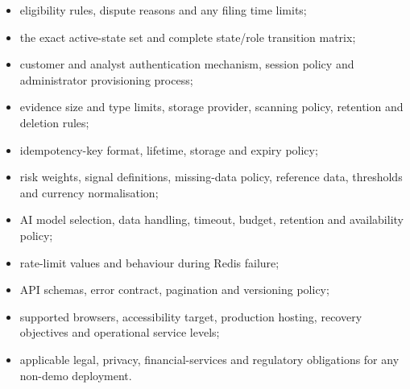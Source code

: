\documentclass[11pt,a4paper]{article}
\begin{document}
\begin{itemize}
    \item eligibility rules, dispute reasons and any filing time limits;
    \item the exact active-state set and complete state/role transition
    matrix;
    \item customer and analyst authentication mechanism, session policy
    and administrator provisioning process;
    \item evidence size and type limits, storage provider, scanning
    policy, retention and deletion rules;
    \item idempotency-key format, lifetime, storage and expiry policy;
    \item risk weights, signal definitions, missing-data policy,
    reference data, thresholds and currency normalisation;
    \item AI model selection, data handling, timeout, budget, retention
    and availability policy;
    \item rate-limit values and behaviour during Redis failure;
    \item API schemas, error contract, pagination and versioning policy;
    \item supported browsers, accessibility target, production hosting,
    recovery objectives and operational service levels;
    \item applicable legal, privacy, financial-services and regulatory
    obligations for any non-demo deployment.
\end{itemize}
\end{document}
